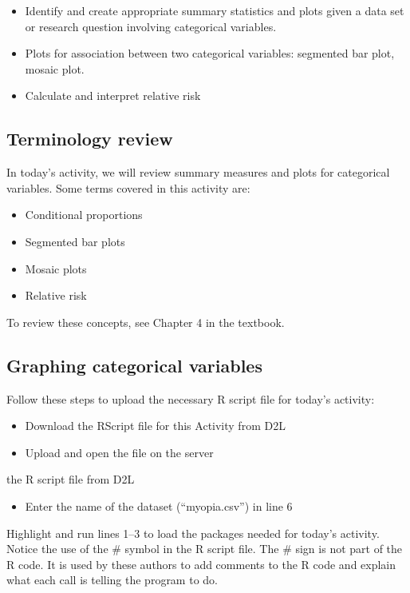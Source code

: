 \documentclass[
]{report}
\providecommand{\tightlist}{%
  \setlength{\itemsep}{0pt}\setlength{\parskip}{0pt}}
\begin{document}
\begin{itemize}
\item
  Identify and create appropriate summary statistics and plots given a data set or research question involving categorical variables.
\item
  Plots for association between two categorical variables:
  segmented bar plot, mosaic plot.
\item
  Calculate and interpret relative risk
\end{itemize}

\subsection{Terminology review}\label{terminology-review-15}

In today's activity, we will review summary measures and plots for categorical variables. Some terms covered in this activity are:

\begin{itemize}
\item
  Conditional proportions
\item
  Segmented bar plots
\item
  Mosaic plots
\item
  Relative risk
\end{itemize}

To review these concepts, see Chapter 4 in the textbook.

\subsection{Graphing categorical variables}\label{graphing-categorical-variables}

Follow these steps to upload the necessary R script file for today's activity:

\begin{itemize}
\item
  Download the RScript file for this Activity from D2L
\item
  Upload and open the file on the server
\end{itemize}

the R script file from D2L

\begin{itemize}
\tightlist
\item
  Enter the name of the dataset (``myopia.csv'') in line 6
\end{itemize}

Highlight and run lines 1--3 to load the packages needed for today's activity. Notice the use of the \# symbol in the R script file. The \# sign is not part of the R code. It is used by these authors to add comments to the R code and explain what each call is telling the program to do.
\end{document}
